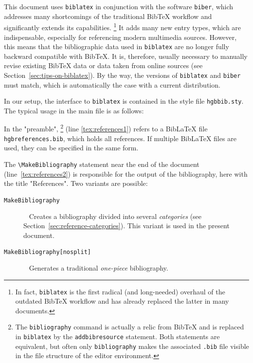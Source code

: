 This document uses \texttt{biblatex} in conjunction with the software
\texttt{biber}, which addresses many shortcomings of the
traditional BibTeX workflow and significantly extends its capabilities.%
\footnote{In fact, \texttt{biblatex} is the first radical (and long-needed)
overhaul of the outdated BibTeX workflow and has already replaced the latter in
many documents.}
It adds many new entry types, which are indispensable, especially for
referencing modern multimedia sources. However, this means that the
bibliographic data used in \texttt{biblatex} are no longer fully backward
compatible with BibTeX. It is, therefore, usually necessary to manually revise
existing BibTeX data or data taken from online sources (see
Section~\ref{sec:tips-on-biblatex}). By the way, the versions of
\texttt{biblatex} and \texttt{biber} must match, which is automatically the
case with a current \latex distribution.

In our setup, the interface to \texttt{biblatex} is contained in the style
file \nolinkurl{hgbbib.sty}. The typical usage in the main \latex file is as
follows:
%
%
In the "preamble",
\verb!!%
\footnote{The \texttt{{\bs}bibliography} command is actually a relic from BibTeX
and is replaced in \texttt{biblatex} by the \texttt{{\bs}addbibresource}
statement. Both statements are equivalent, but often only
\texttt{{\bs}bibliography} makes the associated \texttt{.bib} file visible in
the file structure of the editor environment.}
(line \ref{tex:references1}) refers to a BibLaTeX file \nolinkurl{hgbreferences.bib},
which holds all references.
If multiple BibLaTeX files are used, they can be specified in the same form.

The \verb!\MakeBibliography! statement near the end of the document
(line~\ref{tex:references2}) is responsible for the output of the bibliography,
here with the title "References". Two variants are possible:
%
\begin{description}
    \item[\texttt{{\bs}MakeBibliography}] ~ \newline
    Creates a bibliography divided into several \emph{categories} (see
    Section~\ref{sec:reference-categories}). This variant is used in the present
    document.
%
    \item[\texttt{{\bs}MakeBibliography[nosplit]}] ~ \newline
    Generates a traditional \emph{one-piece} bibliography.
\end{description}

